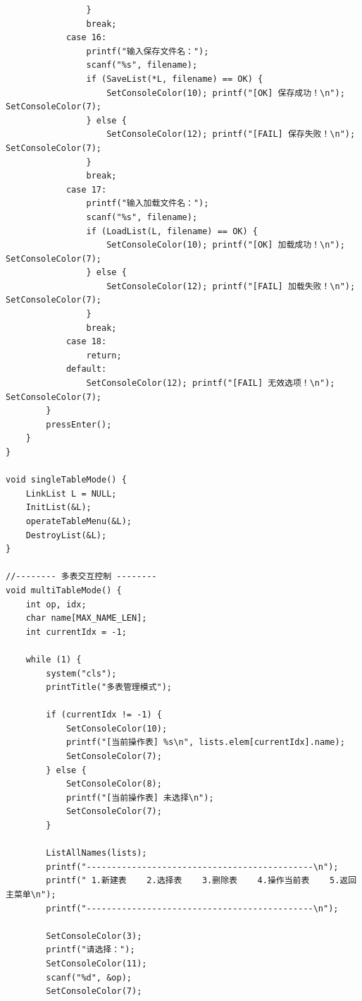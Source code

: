 \documentclass[supercite]{Experimental_Report}
\begin{document}
{\begin{lstlisting}
                }
                break;
            case 16:
                printf("输入保存文件名：");
                scanf("%s", filename);
                if (SaveList(*L, filename) == OK) {
                    SetConsoleColor(10); printf("[OK] 保存成功！\n"); SetConsoleColor(7);
                } else {
                    SetConsoleColor(12); printf("[FAIL] 保存失败！\n"); SetConsoleColor(7);
                }
                break;
            case 17:
                printf("输入加载文件名：");
                scanf("%s", filename);
                if (LoadList(L, filename) == OK) {
                    SetConsoleColor(10); printf("[OK] 加载成功！\n"); SetConsoleColor(7);
                } else {
                    SetConsoleColor(12); printf("[FAIL] 加载失败！\n"); SetConsoleColor(7);
                }
                break;
            case 18:
                return;
            default:
                SetConsoleColor(12); printf("[FAIL] 无效选项！\n"); SetConsoleColor(7);
        }
        pressEnter();
    }
}

void singleTableMode() {
    LinkList L = NULL;
    InitList(&L);   
    operateTableMenu(&L);
    DestroyList(&L);
}

//-------- 多表交互控制 --------
void multiTableMode() {
    int op, idx;
    char name[MAX_NAME_LEN];
    int currentIdx = -1;

    while (1) {
        system("cls");
        printTitle("多表管理模式");

        if (currentIdx != -1) {
            SetConsoleColor(10);
            printf("[当前操作表] %s\n", lists.elem[currentIdx].name);
            SetConsoleColor(7);
        } else {
            SetConsoleColor(8);
            printf("[当前操作表] 未选择\n");
            SetConsoleColor(7);
        }

        ListAllNames(lists);
        printf("---------------------------------------------\n");
        printf(" 1.新建表    2.选择表    3.删除表    4.操作当前表    5.返回主菜单\n");
        printf("---------------------------------------------\n");

        SetConsoleColor(3);
        printf("请选择：");
        SetConsoleColor(11);
        scanf("%d", &op);
        SetConsoleColor(7);


\end{lstlisting}}
\end{document}
